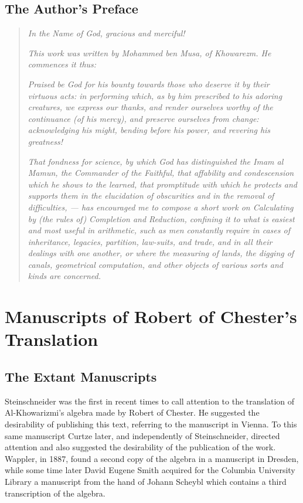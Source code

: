 \documentclass[11pt,a4paper]{book}
\begin{document}
\section*{The Author's Preface}

\begin{quote}
\textit{In the Name of God, gracious and merciful!}

\textit{This work was written by Mohammed ben Musa, of Khowarezm. He commences it thus:}

\textit{Praised be God for his bounty towards those who deserve it by their virtuous acts: in performing which, as by him prescribed to his adoring creatures, we express our thanks, and render ourselves worthy of the continuance (of his mercy), and preserve ourselves from change: acknowledging his might, bending before his power, and revering his greatness!}

\textit{That fondness for science, by which God has distinguished the Imam al Mamun, the Commander of the Faithful, that affability and condescension which he shows to the learned, that promptitude with which he protects and supports them in the elucidation of obscurities and in the removal of difficulties, --- has encouraged me to compose a short work on Calculating by (the rules of) Completion and Reduction, confining it to what is easiest and most useful in arithmetic, such as men constantly require in cases of inheritance, legacies, partition, law-suits, and trade, and in all their dealings with one another, or where the measuring of lands, the digging of canals, geometrical computation, and other objects of various sorts and kinds are concerned.}
\end{quote}

\chapter[Manuscripts of Robert of Chester's Translation]{Manuscripts of Robert of Chester's\\ Translation}

\section{The Extant Manuscripts}

Steinschneider was the first in recent times to call attention to the translation of Al-Khowarizmi's algebra made by Robert of Chester. He suggested the desirability of publishing this text, referring to the manuscript in Vienna. To this same manuscript Curtze later, and independently of Steinschneider, directed attention and also suggested the desirability of the publication of the work. Wappler, in 1887, found a second copy of the algebra in a manuscript in Dresden, while some time later David Eugene Smith acquired for the Columbia University Library a manuscript from the hand of Johann Scheybl which contains a third transcription of the algebra.
\end{document}

